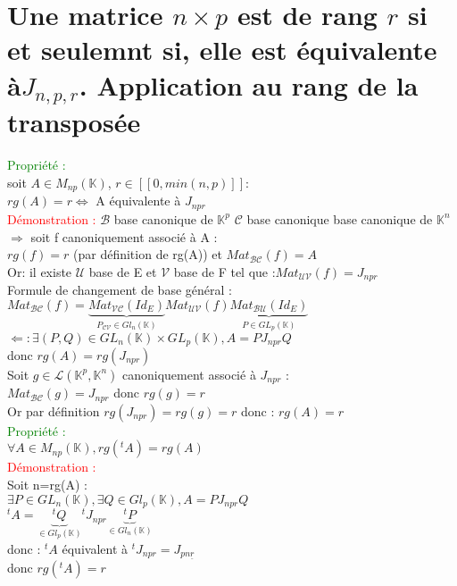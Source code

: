 \documentclass{article}
\begin{document}
        \section{Une matrice $n \times p$ est de rang $r$ si et seulemnt si, elle est équivalente à$J_{n,p,r}$. Application au rang de la transposée}
				\textcolor{green}{Propriété : } \\
				soit $A \in M_{np}(\mathbb K)$, $r \in [[0,min(n,p)]]$: \\
				$rg(A)=r \Longleftrightarrow$ A équivalente à $J_{npr}$ \\
				\textcolor{red}{Démonstration :} $\mathcal B$ base canonique de $\mathbb K^p$ $\mathcal C$ base canonique base canonique de $\mathbb K^n$ \\
				$\Rightarrow$ soit f canoniquement associé à A : \\
				$rg(f)=r$ (par définition de rg(A)) et $Mat_{\mathcal{BC}}(f)=A$ \\
				Or: il existe $\mathcal U$ base de E et $\mathcal V$ base de F tel que :$Mat_{\mathcal{UV}}(f)=J_{npr}$ \\
				Formule de changement de base général : \\
				$Mat_{\mathcal{BC}}(f)=\underbrace{Mat_{\mathcal{VC}}(Id_E)}_{P_{\mathcal{CV}} \in Gl_n(\mathbb K) } Mat_{\mathcal{UV}}(f) \underbrace{Mat_{\mathcal{BU}}(Id_E)}_{P \in GL_p(\mathbb K)}$ \\
				$\Leftarrow : \exists (P,Q) \in GL_n(\mathbb K) \times GL_p(\mathbb K), A=PJ_{npr}Q$ \\
				donc $rg(A)=rg(J_{npr})$ \\
				Soit $g \in \mathcal L(\mathbb K^p, \mathbb K^n)$ canoniquement associé à $J_{npr}$ : \\
				$Mat_{\mathcal{BC}}(g)=J_{npr}$ donc $rg(g)=r$ \\
				Or par définition $rg(J_{npr})=rg(g)=r$ donc : $rg(A)=r$ \\
				\textcolor{green}{Propriété :} \\
				$\forall A \in M_{np}(\mathbb K), rg({}^tA)=rg(A)$ \\
				\textcolor{red}{Démonstration :} \\
				Soit n=rg(A) : \\
				$\exists P \in GL_n(\mathbb K), \exists Q \in Gl_p(\mathbb K),A=PJ_{npr}Q$ \\
				${}^t A = \underbrace{^t Q}_{\in Gl_p (\mathbb K)} {}^t J_{npr} \underbrace{^t P}_{\in Gl_n(\mathbb K)}$ \\
				donc : ${}^t A$ équivalent à ${}^t J_{npr}= J_{pn \underline{r}}$ \\
				donc $rg({}^t A)=r$
\end{document}
